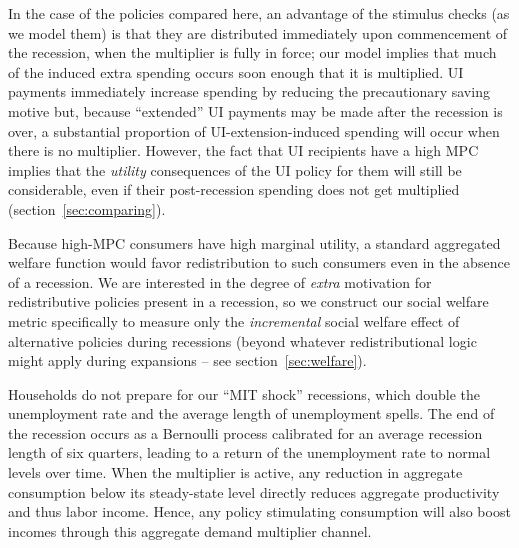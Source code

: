 \documentclass[\econtexRoot/HAFiscal]{subfiles}
\begin{document}
In the case of the policies compared here, an advantage of the stimulus checks (as we model them) is that they are distributed immediately upon commencement of the recession, when the multiplier is fully in force; our model implies that much of the induced extra spending occurs soon enough that it is multiplied.  UI payments immediately increase spending by reducing the precautionary saving motive but, because ``extended'' UI payments may be made after the recession is over, a substantial proportion of UI-extension-induced spending will occur when there is no multiplier.  However, the fact that UI recipients have a high MPC implies that the \textit{utility} consequences of the UI policy for them will still be considerable, even if their post-recession spending does not get multiplied (section~\ref{sec:comparing}).

Because high-MPC consumers have high marginal utility, a standard aggregated welfare function would favor redistribution to such consumers even in the absence of a recession. We are interested in the degree of \textit{extra} motivation for redistributive policies present in a recession, so we construct our social welfare metric specifically to measure only the \textit{incremental} social welfare effect of alternative policies during recessions (beyond whatever redistributional logic might apply during expansions -- see section~\ref{sec:welfare}).

Households do not prepare for our ``MIT shock'' recessions, which double the unemployment rate and the average length of unemployment spells. The end of the recession occurs as a Bernoulli process calibrated for an average recession length of six quarters, leading to a return of the unemployment rate to normal levels over time. When the multiplier is active, any reduction in aggregate consumption below its steady-state level directly reduces aggregate productivity and thus labor income. Hence, any policy stimulating consumption will also boost incomes through this aggregate demand multiplier channel.

\end{document}
